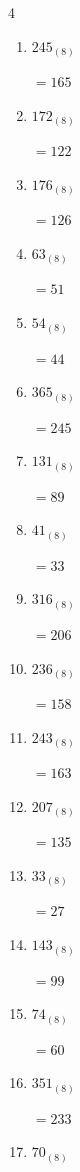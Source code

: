 \begin{multicols}{4}
\begin{enumerate}
  \item $245_{(8)}$

        $=165$

  \item $172_{(8)}$

        $=122$

  \item $176_{(8)}$

        $=126$

  \item $63_{(8)}$

        $=51$

  \item $54_{(8)}$

        $=44$

  \item $365_{(8)}$

        $=245$

  \item $131_{(8)}$

        $=89$

  \item $41_{(8)}$

        $=33$

  \item $316_{(8)}$

        $=206$

  \item $236_{(8)}$

        $=158$

  \item $243_{(8)}$

        $=163$

  \item $207_{(8)}$

        $=135$

  \item $33_{(8)}$

        $=27$

  \item $143_{(8)}$

        $=99$

  \item $74_{(8)}$

        $=60$

\columnbreak %

  \item $351_{(8)}$

        $=233$

  \item $70_{(8)}$


\end{enumerate}
\end{multicols}
